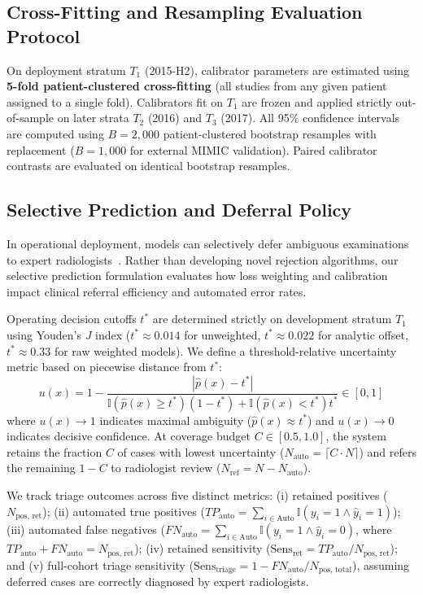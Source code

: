 \documentclass[preprint,12pt]{elsarticle}
\begin{document}
\subsection{Cross-Fitting and Resampling Evaluation Protocol}
On deployment stratum $T_1$ (2015-H2), calibrator parameters are estimated using \textbf{5-fold patient-clustered cross-fitting} (all studies from any given patient assigned to a single fold). Calibrators fit on $T_1$ are frozen and applied strictly out-of-sample on later strata $T_2$ (2016) and $T_3$ (2017). All 95\% confidence intervals are computed using $B = 2,000$ patient-clustered bootstrap resamples with replacement ($B = 1,000$ for external MIMIC validation). Paired calibrator contrasts are evaluated on identical bootstrap resamples.

\subsection{Selective Prediction and Deferral Policy}
In operational deployment, models can selectively defer ambiguous examinations to expert radiologists~\cite{geifman2017selective, kompa2021second, aperstein2026knowing}. Rather than developing novel rejection algorithms, our selective prediction formulation evaluates how loss weighting and calibration impact clinical referral efficiency and automated error rates.

Operating decision cutoffs $t^*$ are determined strictly on development stratum $T_1$ using Youden's $J$ index ($t^* \approx 0.014$ for unweighted, $t^* \approx 0.022$ for analytic offset, $t^* \approx 0.33$ for raw weighted models). We define a threshold-relative uncertainty metric based on piecewise distance from $t^*$:
\begin{equation}
u(x) = 1 - \frac{|\hat{p}(x) - t^*|}{\mathbb{I}(\hat{p}(x) \ge t^*)(1 - t^*) + \mathbb{I}(\hat{p}(x) < t^*)t^*} \in [0, 1]
\label{eq:uncertainty}
\end{equation}
where $u(x) \to 1$ indicates maximal ambiguity ($\hat{p}(x) \approx t^*$) and $u(x) \to 0$ indicates decisive confidence. At coverage budget $C \in [0.5, 1.0]$, the system retains the fraction $C$ of cases with lowest uncertainty ($N_{\text{auto}} = \lceil C \cdot N \rceil$) and refers the remaining $1 - C$ to radiologist review ($N_{\text{ref}} = N - N_{\text{auto}}$).

We track triage outcomes across five distinct metrics: (i) retained positives ($N_{\text{pos, ret}}$); (ii) automated true positives ($TP_{\text{auto}} = \sum_{i \in \text{Auto}} \mathbb{I}(y_i = 1 \land \hat{y}_i = 1)$); (iii) automated false negatives ($FN_{\text{auto}} = \sum_{i \in \text{Auto}} \mathbb{I}(y_i = 1 \land \hat{y}_i = 0)$, where $TP_{\text{auto}} + FN_{\text{auto}} = N_{\text{pos, ret}}$); (iv) retained sensitivity ($\text{Sens}_{\text{ret}} = TP_{\text{auto}} / N_{\text{pos, ret}}$); and (v) full-cohort triage sensitivity ($\text{Sens}_{\text{triage}} = 1 - FN_{\text{auto}} / N_{\text{pos, total}}$), assuming deferred cases are correctly diagnosed by expert radiologists.
\end{document}
